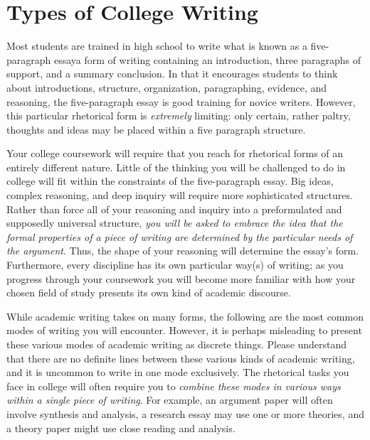 

\chapter{Types of College Writing}

Most students are trained in high school to write what is known as a
five-paragraph essay\textemdash a form of writing containing an introduction,
three paragraphs of support, and a summary conclusion. In that it encourages
students to think about introductions, structure, organization, paragraphing,
evidence, and reasoning, the five-paragraph essay is good training for novice
writers. However, this particular rhetorical form is \emph{extremely} limiting:
only certain, rather paltry, thoughts and ideas may be placed within a five
paragraph structure. 

Your college coursework will require that you reach for rhetorical forms of an
entirely different nature. Little of the thinking you will be challenged to do
in college will fit within the constraints of the five-paragraph essay. Big
ideas, complex reasoning, and deep inquiry will require more sophisticated structures.
Rather than force all of your reasoning and inquiry into a preformulated and
supposedly universal structure, \emph{you will be asked to embrace the idea that
the formal properties of a piece of writing are determined by the particular needs of the
argument}. Thus, the shape of your reasoning will determine the essay's form. Furthermore, every discipline has its own particular way(s) of writing; as you
progress through your coursework you will become more familiar with how your
chosen field of study presents its own kind of academic discourse.

While academic writing takes on many forms, the following are the most common
modes of writing you will encounter. However, it is perhaps misleading to
present these various modes of academic writing as discrete things. Please
understand that there are no definite lines between these various kinds of academic
writing, and it is uncommon to write in one mode exclusively. The rhetorical tasks
you face in college will often require you to \emph{combine these modes in
various ways within a single piece of writing}. For example, an argument paper
will often involve synthesis and analysis, a research essay may use one or more
theories, and a theory paper might use close reading and analysis.

